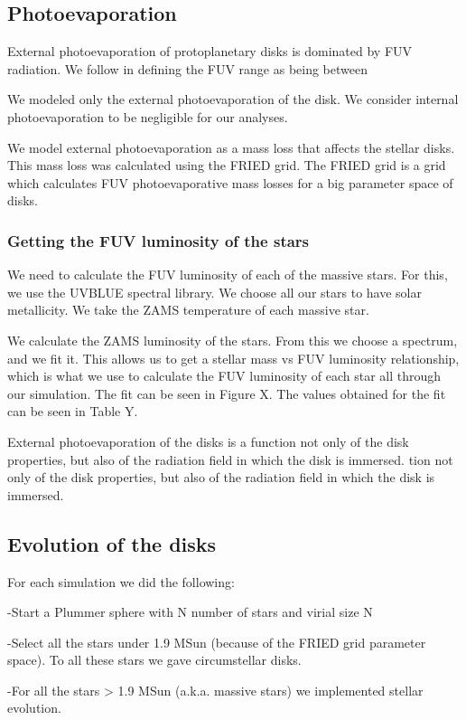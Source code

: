 \documentclass[fleqn,usenatbib]{mnras}
\begin{document}
\subsection{Photoevaporation}
External photoevaporation of protoplanetary disks is dominated by FUV radiation. We follow \citet{adams_photoevaporation_2004} in defining the FUV range as being between 


We modeled only the external photoevaporation of the disk. We consider internal photoevaporation to be negligible for our analyses.

We model external photoevaporation as a mass loss that affects the stellar disks. This mass loss was calculated using the FRIED grid. The FRIED grid is a grid which calculates FUV photoevaporative mass losses for a big parameter space of disks. 

\subsubsection{Getting the FUV luminosity of the stars}
We need to calculate the FUV luminosity of each of the massive stars. For this, we use the UVBLUE spectral library. We choose all our stars to have solar metallicity. We take the ZAMS temperature of each massive star.

We calculate the ZAMS luminosity of the stars. From this we choose a spectrum, and we fit it. This allows us to get a stellar mass vs FUV luminosity relationship, which is what we use to calculate the FUV luminosity of each star all through our simulation. The fit can be seen in Figure X. The values obtained for the fit can be seen in Table Y.

External photoevaporation of the disks is a function not only of the disk properties, but also of the radiation field in which the disk is immersed. tion not only of the disk properties, but also of the radiation field in which the disk is immersed. 

\subsection{Evolution of the disks}
For each simulation we did the following:

-Start a Plummer sphere with N number of stars and virial size N

-Select all the stars under 1.9 MSun (because of the FRIED grid parameter space). To all these stars we gave circumstellar disks.

-For all the stars > 1.9 MSun (a.k.a. massive stars) we implemented stellar evolution.
\end{document}
